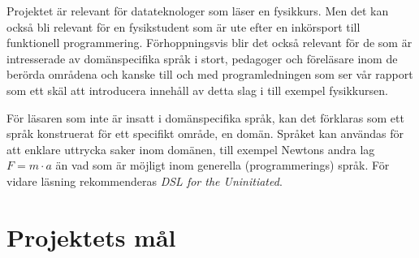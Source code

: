 \begin{binge}
Projektet är relevant för datateknologer som läser en fysikkurs. Men
det kan också bli relevant för en fysikstudent som är ute efter en
inkörsport till funktionell programmering. Förhoppningsvis blir det
också relevant för de som är intresserade av domänspecifika språk i
stort, pedagoger och föreläsare inom de berörda områdena och kanske
till och med programledningen som ser vår rapport som ett skäl att
introducera innehåll av detta slag i till exempel fysikkursen.

För läsaren som inte är insatt i domänspecifika språk, kan det
förklaras som ett språk konstruerat för ett specifikt område, en
domän. Språket kan användas för att enklare uttrycka saker inom
domänen, till exempel Newtons andra lag $F=m \cdot a$ än vad som är
möjligt inom generella (programmerings) språk. För vidare läsning
rekommenderas \textit{DSL for the Uninitiated}.\cite{DSLU}
\end{binge}

%

\section{Projektets mål}

